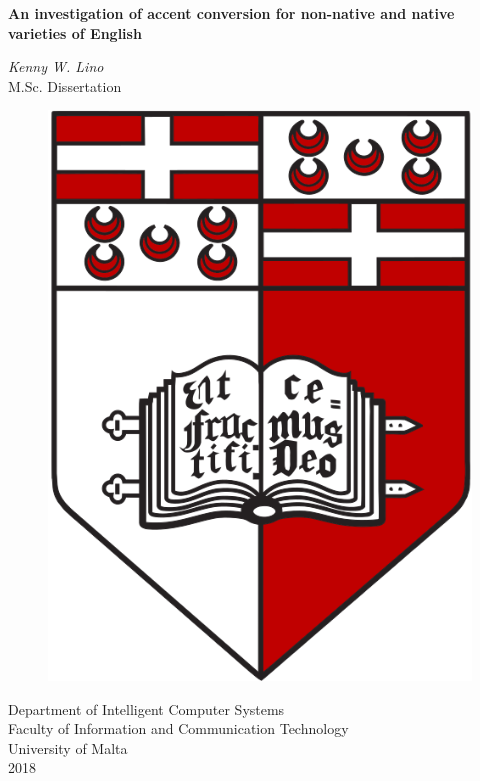 \documentclass
[
    a4paper,
    twoside,
    12pt,
]
{report}
\begin{document}
\begin{titlepage}
    \vspace*{1.0cm}
    \begin{center}
        \begin{Large}
        \textbf{An investigation of accent conversion for non-native and native varieties of English} \\
        \end{Large}
        \vspace*{1.0cm}
        \textit{Kenny W. Lino} \\
        \vspace*{1.5cm}
        M.Sc. Dissertation \\
        \vspace*{0.5cm}
        \begin{figure}[H]
        \centering
        \includegraphics[scale=0.15]{img/UM-coat-of-arms.png}
    	\end{figure}
       \vspace*{1.0cm}
       Department of Intelligent Computer Systems \\
       Faculty of Information and Communication Technology \\
       University of Malta \\
       2018 \\
       

\end{center}
\end{titlepage}
\end{document}
